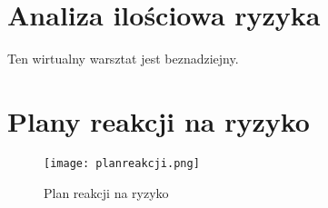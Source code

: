 
\section{Analiza ilościowa ryzyka}

Ten wirtualny warsztat jest beznadziejny.


\section{Plany reakcji na ryzyko}

\begin{figure}[h]
\begin{center}
\texttt{[image: planreakcji.png]}
\caption[Plan reakcji na ryzyko]{Plan reakcji na ryzyko}
\label{rysunekProces}
\end{center}
\end{figure}


